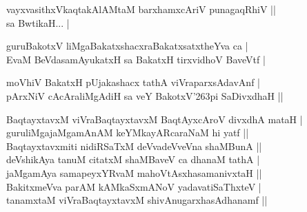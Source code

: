 \begin{entry}
\begin{shl}
vayxvasithxVkaqtakAlAMtaM barxhamxcAriV punagaqRhiV ||\\[2pt]
sa BwtikaH... |\\[-1pt]
\end{shl}
\smallskip
{}
\smallskip
{}
\medskip
\begin{shl}
guruBakotxV liMgaBakatxshacxraBakatxsatxtheYva ca |\\[2pt]
EvaM BeVdasamAyukatxH sa BakatxH tirxvidhoV BaveVtf |\\[-1pt]
\end{shl}
\medskip
{}
\vskip 3pt
\vskip 5pt
\medskip
\begin{shl}
moVhiV BakatxH pUjakashacx tathA viVraparxsAdavAnf |\\[2pt]
pArxNiV cAcAraliMgAdiH sa veY BakotxV{\char'263}pi SaDivxdhaH ||\\[-1pt]
\end{shl}
\medskip
{}
\vskip 5pt
\vskip 5pt
\medskip
\begin{shl}
BaqtayxtavxM viVraBaqtayxtavxM BaqtAyxcAroV divxdhA mataH |\\[2pt]
guruliMgajaMgamAnAM keYMkayARcaraNaM hi yatf ||\\[2pt]
Baqtayxtavxmiti nidiRSaTxM deVvadeVveVna shaMBunA ||\\[2pt]
deVshikAya tanuM citatxM shaMBaveV ca dhanaM tathA |\\[2pt]
jaMgamAya samapeyxYRvaM mahoVtAsxhasamanivxtaH ||\\[2pt]
BakitxmeVva parAM kAMkaSxmANoV yadavatiSaThxteV |\\[2pt]
tanamxtaM viVraBaqtayxtavxM shivAnugarxhasAdhanamf ||\\[-1pt]

\end{shl}
\end{entry}
